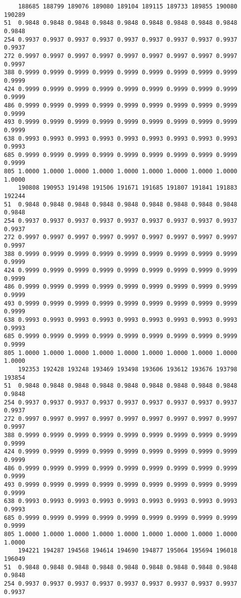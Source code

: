 \documentclass[
]{report}
\begin{document}
\begin{verbatim}
    188685 188799 189076 189080 189104 189115 189733 189855 190080 190289
51  0.9848 0.9848 0.9848 0.9848 0.9848 0.9848 0.9848 0.9848 0.9848 0.9848
254 0.9937 0.9937 0.9937 0.9937 0.9937 0.9937 0.9937 0.9937 0.9937 0.9937
272 0.9997 0.9997 0.9997 0.9997 0.9997 0.9997 0.9997 0.9997 0.9997 0.9997
388 0.9999 0.9999 0.9999 0.9999 0.9999 0.9999 0.9999 0.9999 0.9999 0.9999
424 0.9999 0.9999 0.9999 0.9999 0.9999 0.9999 0.9999 0.9999 0.9999 0.9999
486 0.9999 0.9999 0.9999 0.9999 0.9999 0.9999 0.9999 0.9999 0.9999 0.9999
493 0.9999 0.9999 0.9999 0.9999 0.9999 0.9999 0.9999 0.9999 0.9999 0.9999
638 0.9993 0.9993 0.9993 0.9993 0.9993 0.9993 0.9993 0.9993 0.9993 0.9993
685 0.9999 0.9999 0.9999 0.9999 0.9999 0.9999 0.9999 0.9999 0.9999 0.9999
805 1.0000 1.0000 1.0000 1.0000 1.0000 1.0000 1.0000 1.0000 1.0000 1.0000
    190808 190953 191498 191506 191671 191685 191807 191841 191883 192244
51  0.9848 0.9848 0.9848 0.9848 0.9848 0.9848 0.9848 0.9848 0.9848 0.9848
254 0.9937 0.9937 0.9937 0.9937 0.9937 0.9937 0.9937 0.9937 0.9937 0.9937
272 0.9997 0.9997 0.9997 0.9997 0.9997 0.9997 0.9997 0.9997 0.9997 0.9997
388 0.9999 0.9999 0.9999 0.9999 0.9999 0.9999 0.9999 0.9999 0.9999 0.9999
424 0.9999 0.9999 0.9999 0.9999 0.9999 0.9999 0.9999 0.9999 0.9999 0.9999
486 0.9999 0.9999 0.9999 0.9999 0.9999 0.9999 0.9999 0.9999 0.9999 0.9999
493 0.9999 0.9999 0.9999 0.9999 0.9999 0.9999 0.9999 0.9999 0.9999 0.9999
638 0.9993 0.9993 0.9993 0.9993 0.9993 0.9993 0.9993 0.9993 0.9993 0.9993
685 0.9999 0.9999 0.9999 0.9999 0.9999 0.9999 0.9999 0.9999 0.9999 0.9999
805 1.0000 1.0000 1.0000 1.0000 1.0000 1.0000 1.0000 1.0000 1.0000 1.0000
    192353 192428 193248 193469 193498 193606 193612 193676 193798 193854
51  0.9848 0.9848 0.9848 0.9848 0.9848 0.9848 0.9848 0.9848 0.9848 0.9848
254 0.9937 0.9937 0.9937 0.9937 0.9937 0.9937 0.9937 0.9937 0.9937 0.9937
272 0.9997 0.9997 0.9997 0.9997 0.9997 0.9997 0.9997 0.9997 0.9997 0.9997
388 0.9999 0.9999 0.9999 0.9999 0.9999 0.9999 0.9999 0.9999 0.9999 0.9999
424 0.9999 0.9999 0.9999 0.9999 0.9999 0.9999 0.9999 0.9999 0.9999 0.9999
486 0.9999 0.9999 0.9999 0.9999 0.9999 0.9999 0.9999 0.9999 0.9999 0.9999
493 0.9999 0.9999 0.9999 0.9999 0.9999 0.9999 0.9999 0.9999 0.9999 0.9999
638 0.9993 0.9993 0.9993 0.9993 0.9993 0.9993 0.9993 0.9993 0.9993 0.9993
685 0.9999 0.9999 0.9999 0.9999 0.9999 0.9999 0.9999 0.9999 0.9999 0.9999
805 1.0000 1.0000 1.0000 1.0000 1.0000 1.0000 1.0000 1.0000 1.0000 1.0000
    194221 194287 194568 194614 194690 194877 195064 195694 196018 196049
51  0.9848 0.9848 0.9848 0.9848 0.9848 0.9848 0.9848 0.9848 0.9848 0.9848
254 0.9937 0.9937 0.9937 0.9937 0.9937 0.9937 0.9937 0.9937 0.9937 0.9937

\end{verbatim}
\end{document}

